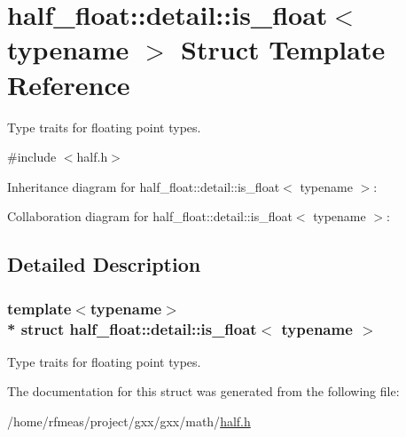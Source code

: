 \hypertarget{structhalf__float_1_1detail_1_1is__float}{}\section{half\+\_\+float\+:\+:detail\+:\+:is\+\_\+float$<$ typename $>$ Struct Template Reference}
\label{structhalf__float_1_1detail_1_1is__float}


Type traits for floating point types.  




{\ttfamily \#include $<$half.\+h$>$}



Inheritance diagram for half\+\_\+float\+:\+:detail\+:\+:is\+\_\+float$<$ typename $>$\+:


Collaboration diagram for half\+\_\+float\+:\+:detail\+:\+:is\+\_\+float$<$ typename $>$\+:


\subsection{Detailed Description}
\subsubsection*{template$<$typename$>$\\*
struct half\+\_\+float\+::detail\+::is\+\_\+float$<$ typename $>$}

Type traits for floating point types. 

The documentation for this struct was generated from the following file\+:\begin{DoxyCompactItemize}
\item 
/home/rfmeas/project/gxx/gxx/math/\hyperlink{half_8h}{half.\+h}\end{DoxyCompactItemize}
